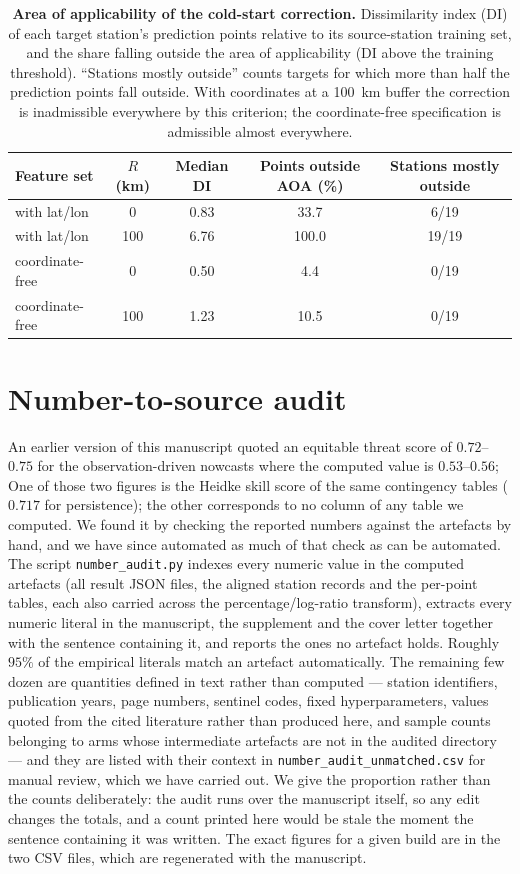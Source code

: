 \documentclass[11pt]{article}
\begin{document}
\begin{table}[htbp]\centering\footnotesize
\caption{\textbf{Area of applicability of the cold-start correction.} Dissimilarity index (DI) of each target station's prediction points relative to its source-station training set, and the share falling outside the area of applicability (DI above the training threshold). ``Stations mostly outside'' counts targets for which more than half the prediction points fall outside. With coordinates at a 100~km buffer the correction is inadmissible everywhere by this criterion; the coordinate-free specification is admissible almost everywhere.}
\label{si:t28}
\begin{tabular}{lcccc}\toprule
Feature set & $R$ (km) & Median DI & Points outside AOA (\%) & Stations mostly outside \\ \midrule
with lat/lon & 0 & 0.83 & 33.7 & 6/19 \\
with lat/lon & 100 & 6.76 & 100.0 & 19/19 \\
coordinate-free & 0 & 0.50 & 4.4 & 0/19 \\
coordinate-free & 100 & 1.23 & 10.5 & 0/19 \\
\bottomrule\end{tabular}\end{table}


\section{Number-to-source audit}
An earlier version of this manuscript quoted an equitable threat score of $0.72$--$0.75$
for the observation-driven nowcasts where the computed value is $0.53$--$0.56$; One of those
two figures is the Heidke skill score of the same contingency tables ($0.717$ for
persistence); the other corresponds to no column of any table we computed. We found it by
checking the reported numbers against the artefacts by hand, and we have since automated
as much of that check as can be automated. The script \texttt{number\_audit.py} indexes
every numeric value in the computed artefacts (all result JSON files, the aligned station
records and the per-point tables, each also carried across the percentage/log-ratio
transform), extracts every numeric literal in the manuscript, the supplement and the cover
letter together with the sentence containing it, and reports the ones no artefact holds.
Roughly $95\%$ of the empirical literals match an artefact automatically. The remaining
few dozen are quantities defined in text rather than computed --- station identifiers,
publication years, page numbers, sentinel codes, fixed hyperparameters, values quoted from
the cited literature rather than produced here, and sample counts
belonging to arms whose intermediate artefacts are not in the audited directory --- and
they are listed with their context in
\texttt{number\_audit\_unmatched.csv} for manual review, which we have carried out. We
give the proportion rather than the counts deliberately: the audit runs over the
manuscript itself, so any edit changes the totals, and a count printed here would be stale
the moment the sentence containing it was written. The exact figures for a given build are
in the two CSV files, which are regenerated with the manuscript.
\end{document}
